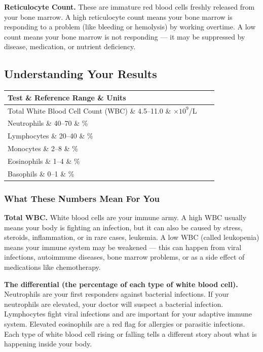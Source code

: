 \textbf{Reticulocyte Count.} These are immature red blood cells freshly released from your bone marrow. A high reticulocyte count means your bone marrow is responding to a problem (like bleeding or hemolysis) by working overtime. A low count means your bone marrow is not responding --- it may be suppressed by disease, medication, or nutrient deficiency.

\subsection{Understanding Your Results}

\begin{longtable}{@{}lll@{}}
\toprule
\textbf{Test} \& \textbf{Reference Range} \& \textbf{Units} \\
\midrule
Total White Blood Cell Count (WBC) \& 4.5--11.0 \& $\times 10^9$/L \\
Neutrophils \& 40--70 \& \% \\
Lymphocytes \& 20--40 \& \% \\
Monocytes \& 2--8 \& \% \\
Eosinophils \& 1--4 \& \% \\
Basophils \& 0--1 \& \% \\
\bottomrule
\end{longtable}

\subsubsection{What These Numbers Mean For You}

\textbf{Total WBC.} White blood cells are your immune army. A high WBC usually means your body is fighting an infection, but it can also be caused by stress, steroids, inflammation, or in rare cases, leukemia. A low WBC (called leukopenia) means your immune system may be weakened --- this can happen from viral infections, autoimmune diseases, bone marrow problems, or as a side effect of medications like chemotherapy.

\textbf{The differential (the percentage of each type of white blood cell).} Neutrophils are your first responders against bacterial infections. If your neutrophils are elevated, your doctor will suspect a bacterial infection. Lymphocytes fight viral infections and are important for your adaptive immune system. Elevated eosinophils are a red flag for allergies or parasitic infections. Each type of white blood cell rising or falling tells a different story about what is happening inside your body.

